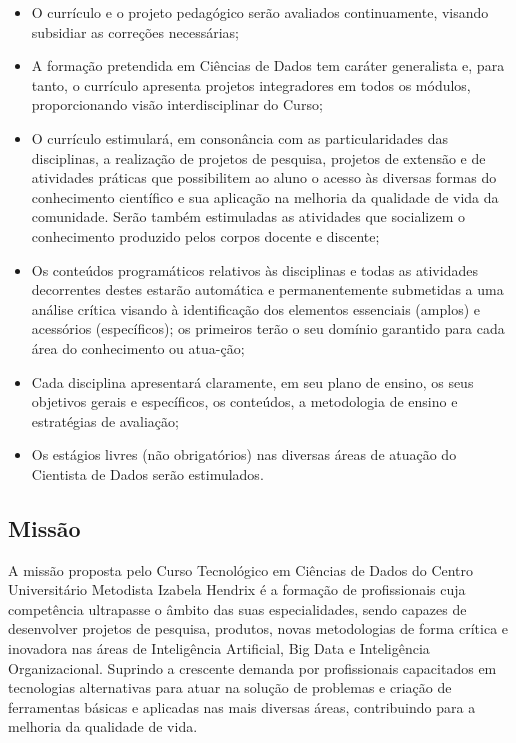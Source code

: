 \documentclass[a4paper, 12pt, openright, oneside, german, french, english, brazil]{abntex2}
\begin{document}
\begin{itemize}
\item O currículo e o projeto pedagógico serão avaliados continuamente, visando subsidiar as correções necessárias;
\item A formação pretendida em Ciências de Dados tem caráter generalista e, para tanto, o currículo apresenta projetos integradores em todos os módulos, proporcionando visão interdisciplinar do Curso;
\item O currículo estimulará, em consonância com as particularidades das disciplinas, a realização de projetos de pesquisa, projetos de extensão e de atividades práticas que possibilitem ao aluno o acesso às diversas formas do conhecimento científico e sua aplicação na melhoria da qualidade de vida da comunidade. Serão também estimuladas as atividades que socializem o conhecimento produzido pelos corpos docente e discente;
\item Os conteúdos programáticos relativos às disciplinas e todas as atividades decorrentes destes estarão automática e permanentemente submetidas a uma análise crítica visando à identificação dos elementos essenciais (amplos) e acessórios (específicos); os primeiros terão o seu domínio garantido para cada área do conhecimento ou atua-ção;
\item Cada disciplina apresentará claramente, em seu plano de ensino, os seus objetivos gerais e específicos, os conteúdos, a metodologia de ensino e estratégias de avaliação;
\item Os estágios livres (não obrigatórios) nas diversas áreas de atuação do Cientista de Dados serão estimulados.
\end{itemize}

\subsection{Missão}

A missão proposta pelo Curso Tecnológico em Ciências de Dados do Centro Universitário Metodista Izabela Hendrix é a formação de profissionais cuja competência ultrapasse o âmbito das suas especialidades, sendo capazes de desenvolver projetos de pesquisa, produtos, novas metodologias de forma crítica e inovadora nas áreas de Inteligência Artificial, Big Data e Inteligência Organizacional. Suprindo a crescente demanda por profissionais capacitados em tecnologias alternativas para atuar na solução de problemas e criação de ferramentas básicas e aplicadas nas mais diversas áreas, contribuindo para a melhoria da qualidade de vida.
\end{document}
